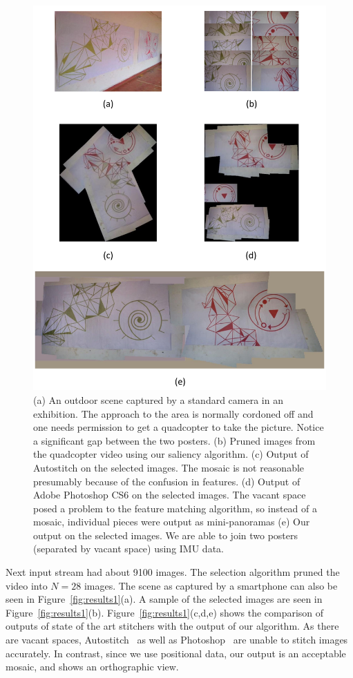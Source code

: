 \documentclass[11pt]{article}
\begin{document}
\begin{figure}[h!]
\centering
\includegraphics[width=0.86\linewidth]{mosaicing/results/results}
\caption{(a) An outdoor scene captured by a standard camera in an
  exhibition. The approach to the area is normally cordoned off and one
  needs permission to get a quadcopter to take the picture.  Notice a
  significant gap between the two posters.  (b) Pruned images from the
  quadcopter video using our saliency algorithm. (c) Output of
  Autostitch on the selected images. The mosaic is not reasonable
  presumably because of the confusion in features. (d) Output of Adobe
  Photoshop CS6 on the selected images. The vacant space posed a
  problem to the feature matching algorithm, so instead of a mosaic,
  individual pieces were output as mini-panoramas (e) Our output on
  the selected images. We are able to join two posters (separated by
  vacant space) using IMU data.}
\label{fig:results}
\end{figure}

Next input stream had about 9100 images. The selection algorithm pruned the
video into $N=28$ images. The scene as captured by a smartphone can also be seen in
Figure~\ref{fig:results1}(a). A sample of the selected images are seen in
Figure~\ref{fig:results1}(b). Figure~\ref{fig:results1}(c,d,e) shows the
comparison of outputs of state of the art stitchers with the output of our
algorithm. As there are vacant spaces, Autostitch~\cite{autostitch} as well as
Photoshop~\cite{photoshop} are unable to stitch images accurately. In contrast,
since we use positional data, our output is an acceptable mosaic, and shows an
orthographic view.
\end{document}
